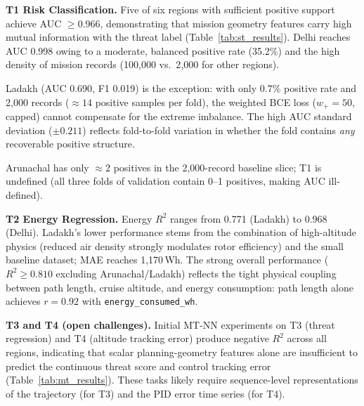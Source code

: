 \documentclass{article}
\theoremstyle{plain}
\theoremstyle{definition}
\begin{document}
\textbf{T1 Risk Classification.}
Five of six regions with sufficient positive support achieve AUC $\geq 0.966$,
demonstrating that mission geometry features carry high mutual information
with the threat label (Table~\ref{tab:st_results}).
Delhi reaches AUC 0.998 owing to a moderate, balanced positive rate (35.2\%)
and the high density of mission records (100{,}000 vs.\ 2{,}000 for other
regions).

Ladakh (AUC 0.690, F1 0.019) is the exception: with only 0.7\% positive
rate and 2{,}000 records ($\approx 14$ positive samples per fold),
the weighted BCE loss ($w_+ = 50$, capped) cannot compensate for the
extreme imbalance. The high AUC standard deviation ($\pm 0.211$) reflects
fold-to-fold variation in whether the fold contains \emph{any} recoverable
positive structure.

Arunachal has only $\approx 2$ positives in the 2{,}000-record baseline
slice; T1 is undefined (all three folds of validation contain 0--1
positives, making AUC ill-defined).

\textbf{T2 Energy Regression.}
Energy $R^2$ ranges from 0.771 (Ladakh) to 0.968 (Delhi).
Ladakh's lower performance stems from the combination of high-altitude
physics (reduced air density strongly modulates rotor efficiency) and
the small baseline dataset; MAE reaches 1,170\,Wh.
The strong overall performance ($R^2 \geq 0.810$ excluding Arunachal/Ladakh)
reflects the tight physical coupling between path length, cruise altitude,
and energy consumption: path length alone achieves $r = 0.92$ with
\texttt{energy\_consumed\_wh}.

\textbf{T3 and T4 (open challenges).}
Initial MT-NN experiments on T3 (threat regression) and T4 (altitude
tracking error) produce negative $R^2$ across all regions, indicating
that scalar planning-geometry features alone are insufficient to predict
the continuous threat score and control tracking error (Table~\ref{tab:mt_results}).
These tasks likely require sequence-level representations of the trajectory
(for T3) and the PID error time series (for T4).
\end{document}
